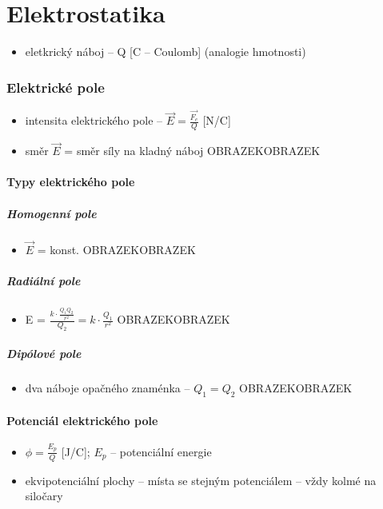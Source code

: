 \documentclass{article}
\begin{document}
\part{Elektrostatika}
\begin{itemize}
  \item eletkrický náboj -- Q [C -- Coulomb] (analogie hmotnosti)
\end{itemize}
\section{Elektrické pole}
\begin{itemize}
  \item intensita elektrického pole -- $\overrightarrow{E} = \frac{\overrightarrow{F_e}}{Q}$ [N/C]
  \item směr $\overrightarrow{E}$ = směr síly na kladný náboj OBRAZEKOBRAZEK
\end{itemize}
\subsection{Typy elektrického pole}
\subsubsection{Homogenní pole}
\begin{itemize}
  \item $\overrightarrow{E}$ = konst. OBRAZEKOBRAZEK
\end{itemize}
\subsubsection{Radiální pole}
\begin{itemize}
  \item E = $\frac{k\cdot\frac{Q_1 Q_2}{r^2}}{Q_2} = k\cdot\frac{Q_1}{r^2}$ OBRAZEKOBRAZEK
\end{itemize}
\subsubsection{Dipólové pole}
\begin{itemize}
  \item dva náboje opačného znaménka -- $Q_1 = Q_2$ OBRAZEKOBRAZEK
\end{itemize}
\subsection{Potenciál elektrického pole}
\begin{itemize}
  \item $\phi = \frac{E_p}{Q}$ [J/C]; $E_p$ -- potenciální energie
  \item ekvipotenciální plochy -- místa se stejným potenciálem -- vždy kolmé na siločary
\end{itemize}
\end{document}
